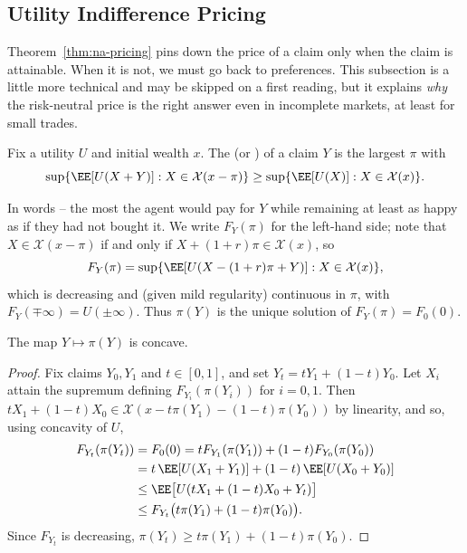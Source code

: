 \subsection{Utility Indifference Pricing}

Theorem~\ref{thm:na-pricing} pins down the price of a claim only when the claim is attainable. When it is not, we must go back to preferences. This subsection is a little more technical and may be skipped on a first reading, but it explains \emph{why} the risk-neutral price is the right answer even in incomplete markets, at least for small trades.

\begin{definition}
	Fix a utility $U$ and initial wealth $x$. The  (or ) of a claim $Y$ is the largest $\pi$ with
	$$
	\sup\{\EE[U(X+Y)] : X \in \mathcal{X}(x - \pi)\} \geq \sup\{\EE[U(X)] : X \in \mathcal{X}(x)\}.
	$$
\end{definition}

In words -- the most the agent would pay for $Y$ while remaining at least as happy as if they had not bought it. We write $F_Y(\pi)$ for the left-hand side; note that $X \in \mathcal{X}(x-\pi)$ if and only if $X + (1+r)\pi \in \mathcal{X}(x)$, so
$$
F_Y(\pi) = \sup\{\EE[U(X - (1+r)\pi + Y)] : X \in \mathcal{X}(x)\},
$$
which is decreasing and (given mild regularity) continuous in $\pi$, with $F_Y(\mp\infty) = U(\pm\infty)$. Thus $\pi(Y)$ is the unique solution of $F_Y(\pi) = F_0(0)$.

\begin{theorem}
	The map $Y \mapsto \pi(Y)$ is concave.
\end{theorem}

\begin{proof}
	Fix claims $Y_0, Y_1$ and $t \in [0,1]$, and set $Y_t = tY_1 + (1-t)Y_0$. Let $X_i$ attain the supremum defining $F_{Y_i}(\pi(Y_i))$ for $i = 0,1$. Then $tX_1 + (1-t)X_0 \in \mathcal{X}(x - t\pi(Y_1) - (1-t)\pi(Y_0))$ by linearity, and so, using concavity of $U$,
	\begin{align*}
		F_{Y_t}(\pi(Y_t)) &= F_0(0) = tF_{Y_1}(\pi(Y_1)) + (1-t)F_{Y_0}(\pi(Y_0))\\
		&= t\,\EE[U(X_1 + Y_1)] + (1-t)\,\EE[U(X_0+Y_0)]\\
		&\leq \EE\big[U(tX_1 + (1-t)X_0 + Y_t)\big]\\
		&\leq F_{Y_t}\big(t\pi(Y_1) + (1-t)\pi(Y_0)\big).
	\end{align*}
	Since $F_{Y_t}$ is decreasing, $\pi(Y_t) \geq t\pi(Y_1) + (1-t)\pi(Y_0)$.
\end{proof}

